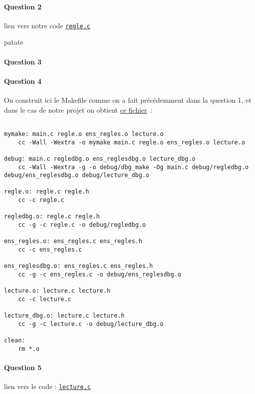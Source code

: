 \documentclass{article}
\begin{document}
\paragraph{Question 2}

lien vers notre code \texttt{\href{https://github.com/LostExcalibur/mymake/blob/master/regle.c}{regle.c}}

patate

\paragraph{Question 3}

\paragraph{Question 4}

On construit ici le Makefile comme on a fait précédemment dans la question 1, et dans le cas de notre projet on obtient \href{https://github.com/LostExcalibur/mymake/blob/master/Makefile}{ce fichier}~:

\begin{verbatim}

mymake: main.c regle.o ens_regles.o lecture.o
    cc -Wall -Wextra -o mymake main.c regle.o ens_regles.o lecture.o

debug: main.c regledbg.o ens_reglesdbg.o lecture_dbg.o
    cc -Wall -Wextra -g -o debug/dbg_make -Og main.c debug/regledbg.o debug/ens_reglesdbg.o debug/lecture_dbg.o

regle.o: regle.c regle.h
    cc -c regle.c

regledbg.o: regle.c regle.h
    cc -g -c regle.c -o debug/regledbg.o

ens_regles.o: ens_regles.c ens_regles.h
    cc -c ens_regles.c

ens_reglesdbg.o: ens_regles.c ens_regles.h
    cc -g -c ens_regles.c -o debug/ens_reglesdbg.o

lecture.o: lecture.c lecture.h
    cc -c lecture.c

lecture_dbg.o: lecture.c lecture.h
    cc -g -c lecture.c -o debug/lecture_dbg.o

clean:
    rm *.o

\end{verbatim}

\paragraph{Question 5}

lien vers le code : \texttt{\href{https://github.com/LostExcalibur/mymake/blob/master/lecture.c}{lecture.c}}
\end{document}
